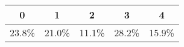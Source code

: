 
\begin{tabular}{c|c|c|c|c}
\hline
0 & 1 & 2 & 3 & 4\\
\hline
23.8\% & 21.0\% & 11.1\% & 28.2\% & 15.9\%\\
\hline
\end{tabular}
